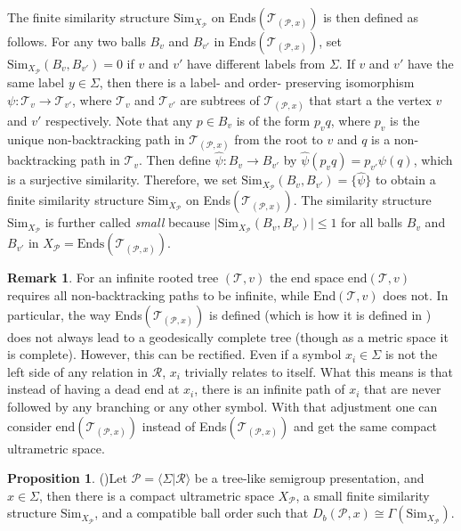 \documentclass[12pt]{amsart}
\numberwithin{equation}{subsection}
\theoremstyle{definition}
\newtheorem{proposition}[theorem]{Proposition}
\theoremstyle{definition}
\newtheorem{remark}[theorem]{Remark}
\theoremstyle{remark}
\begin{document}
    The finite similarity structure $\text{Sim}_{X_{\mathcal P}}$ on Ends$(\mathcal T_{(\mathcal P, x)})$ is then defined as follows. For any two balls $B_v$ and $B_{v'}$ in Ends$(\mathcal T_{(\mathcal P, x)})$, set $\text{Sim}_{X_{\mathcal P}}(B_v,B_{v'})=0$ if $v$ and $v'$ have different labels from $\Sigma$. If $v$ and $v'$ have the same label $y \in \Sigma$, then there is a label- and order- preserving isomorphism $\psi: \mathcal T_v \rightarrow \mathcal T_{v'}$, where $\mathcal T_v$ and $ \mathcal T_{v'}$ are subtrees of $\mathcal T_{(\mathcal P, x)}$ that start a the vertex $v$ and $v'$ respectively. Note that any $p \in B_v$ is of the form $p_vq$, where $p_v$ is the unique non-backtracking path in $\mathcal T_{(\mathcal P, x)}$ from the root to $v$ and $q$ is a non-backtracking path in $\mathcal T_v$. Then define $\hat \psi: B_v \rightarrow B_{v'}$ by $\hat\psi(p_vq) = p_{v'}\psi(q)$, which is a surjective similarity. Therefore, we set $\text{Sim}_{X_\mathcal P} (B_v,B_{v'}) = \{\hat \psi \}$ to obtain a finite similarity structure $\text{Sim}_{X_\mathcal P}$ on Ends$(\mathcal T_{(\mathcal P, x)})$. The similarity structure $\text{Sim}_{X_\mathcal P}$ is further called \textit{small} because $\vert \text{Sim}_{X_\mathcal P} (B_v,B_{v'})\vert \leq 1$ for all balls $B_v$ and $B_{v'}$ in $X_\mathcal P = \text{Ends}(\mathcal T_{(\mathcal P, x)})$. 

    \begin{remark}\label{re:CompleteTree}
     For an infinite rooted tree $(\mathcal T, v)$ the end space $\text{end}(\mathcal T, v)$ requires all non-backtracking paths to be infinite, while $\text{End}(\mathcal T, v)$ does not. In particular, the way Ends$(\mathcal T_{(\mathcal P, x)})$ is defined (which is how it is defined in \cite{hughes2017braided}) does not always lead to a geodesically complete tree (though as a metric space it is complete). However, this can be rectified. Even if a symbol $x_i \in \Sigma$ is not the left side of any relation in $\mathcal R$, $x_i$ trivially relates to itself. What this means is that instead of having a dead end at $x_i$, there is an infinite path of $x_i$ that are never followed by any branching or any other symbol. With that adjustment one can consider $\text{end}(\mathcal T_{(\mathcal P, x)})$ instead of Ends$(\mathcal T_{(\mathcal P, x)})$ and get the same compact ultrametric space. 
\end{remark}

    \begin{proposition}(\cite[Theorem 4.12]{hughes2017braided})\label{prop:diagramFSS}
    Let $\mathcal P = \langle \Sigma \vert \mathcal R \rangle$ be a tree-like semigroup presentation, and $x \in \Sigma$, then there is a compact ultrametric space $X_\mathcal{P}$, a small finite similarity structure $\text{Sim}_{X_\mathcal P}$, and a compatible ball order such that $D_b(\mathcal P, x) \cong \Gamma(\text{Sim}_{X_\mathcal P})$.
\end{proposition}
\end{document}

